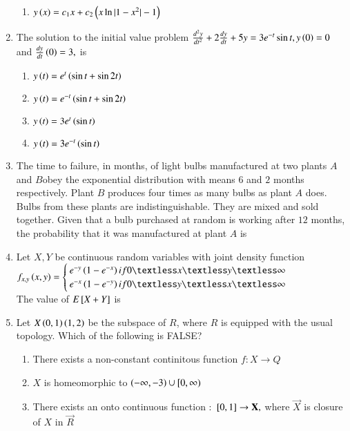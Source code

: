 \documentclass[journal]{IEEEtran}
\begin{document}
\begin{enumerate}
\begin{enumerate}
        \item $y\left(x\right)=c_1x+c_2\left(x\ln|1-x^2|-1\right)$\\
    \end{enumerate}
    \item The solution to the initial value problem $\frac{d^2y}{dt^2}+2\frac{dy}{dt}+5y=3e^{-t}\sin{t},y\left(0\right)=0$ and $\frac{dy}{dt}\left(0\right)=3,$ is
    \begin{enumerate}
        \item $y\left(t\right)=e^{t}\left(\sin{t}+\sin{2t}\right)$
        \item $y\left(t\right)=e^{-t}\left(\sin{t}+\sin{2t}\right)$
        \item $y\left(t\right)=3e^{t}\left(\sin{t}\right)$
        \item $y\left(t\right)=3e^{-t}\left(\sin{t}\right)$ \\
    \end{enumerate}
    \item The time to failure, in months, of light bulbs manufactured at two plants $A$ and $B $obey the exponential distribution with means $6$ and $2$ months respectively. Plant $B$ produces four times as many bulbs as plant $A$ does. Bulbs from these plants are indistinguishable. They are mixed and sold together. Given that a bulb purchased at random is working after $12$ months, the probability that it was manufactured at plant $A$ is\\
    \item Let $X,Y$ be continuous random variables with joint density function\\
    $f_{x,y}\brak{x,y}=\begin{cases}
        e^{-y}\brak{1-e^{-x}}  if  0\textless x\textless y \textless\infty\\ e^{-x}\brak{1-e^{-y}}  if  0\textless y\textless x \textless\infty
    \end{cases}$\\
    The value of  $E{}\left[X+Y\right]$ is \\
    \item Let $X\left(0,1\right) \left(1,2\right)$ be the subspace of $R$, where $R$ is equipped with the usual topology. Which of the following is FALSE?
    \begin{enumerate}
        \item There exists a non-constant continitous function $f:X\rightarrow Q$
        \item  $X$ is homeomorphic to $\left(-\infty,-3\right)\cup[ 0,\infty ) $ 
        \item There exists an onto continuous function : ${}\left[0,1\right]\rightarrow \mathbf{X},$ where $\Vec{X}$ is closure of $X$ in $\vec{R}$

\end{enumerate}
\end{enumerate}
\end{document}
